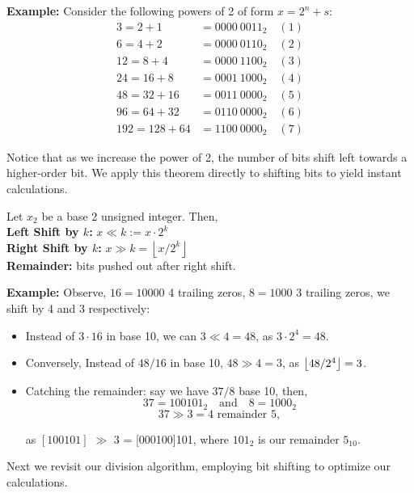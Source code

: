 \textbf{Example:} Consider the following powers of 2 of form $x=2^n+s$:
\begin{align*}
    3 = 2 + 1 &= 0000 \ 0011_2 \quad (1) \\
    6 = 4 + 2 &= 0000 \ 0110_2 \quad (2) \\
    12 = 8 + 4 &= 0000 \ 1100_2 \quad (3) \\
    24 = 16 + 8 &= 0001 \ 1000_2 \quad (4) \\
    48 = 32 + 16 &= 0011 \ 0000_2 \quad (5) \\
    96 = 64 + 32 &= 0110 \ 0000_2 \quad (6) \\
    192 = 128 + 64 &= 1100 \ 0000_2 \quad (7)
\end{align*}

\noindent
Notice that as we increase the power of 2, the number of bits shift left towards a higher-order bit. We apply this theorem directly to 
shifting bits to yield instant calculations.

\begin{theo}

    Let $x_2$ be a base 2 unsigned integer. Then,\\
    \noindent
    \textbf{Left Shift by $k$:} $x \ll k:= x \cdot 2^k$\\
    \noindent
    \textbf{Right Shift by $k$:} $x \gg k = \left\lfloor x/2^k \right\rfloor$\\
    \textbf{Remainder:} bits pushed out after right shift.
\end{theo}
\noindent
\textbf{Example:} Observe, $16=10000$ 4 trailing zeros, $8=1000$ 3 trailing zeros, we shift by 4 and 3 respectively:
\begin{itemize}
    \item Instead of $3 \cdot 16$ in base 10, we can $3 \ll 4=48$, as $3 \cdot 2^4 = 48$.
    \item Conversely, Instead of $48/16$ in base 10, $48 \gg 4 = 3$, as $\floor*{48/2^4} = 3$.
    \item Catching the remainder: say we have $37/8$ base 10, then,
        \[ 37 = 100101_2 \quad \text{and} \quad 8 = 1000_2 \]
        \[ 37 \gg 3 = 4 \text{ remainder } 5, \]

    \noindent    
    as  $[100101]$ $\gg$ 3 = [000100]101, where $101_2$ is our remainder $5_{10}$.
\end{itemize}

\noindent
Next we revisit our division algorithm, employing bit shifting to optimize our calculations.

